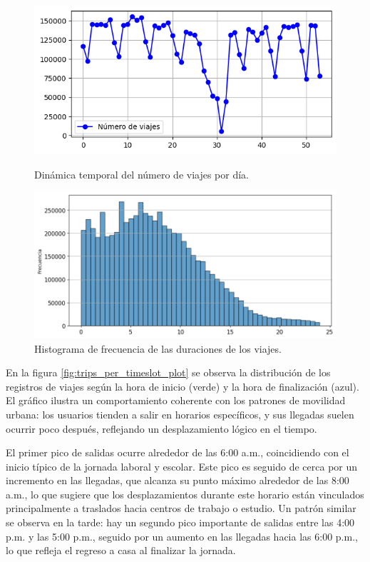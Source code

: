 \begin{figure}[!htb]
\centering
\begin{minipage}{0.45\textwidth}
    \centering
    \includegraphics[width=\textwidth]{Graphics/trips_per_day.png}
    \caption{Dinámica temporal del número de viajes por día.}
    \label{fig:trips_per_day}
\end{minipage}%
\hfill
\begin{minipage}{0.45\textwidth}
    \centering
    \includegraphics[width=\textwidth]{Graphics/trip_duration_histogram.png}
    \caption{Histograma de frecuencia de las duraciones de los viajes.}
    \label{fig:trip_duration_histogram}
\end{minipage}%
\end{figure}

En la figura \ref{fig:trips_per_timeslot_plot} se observa la distribución de los registros de viajes según la hora de inicio (verde) y la hora de finalización (azul). El gráfico ilustra un comportamiento coherente con los patrones de movilidad urbana: los usuarios tienden a salir en horarios específicos, y sus llegadas suelen ocurrir poco después, reflejando un desplazamiento lógico en el tiempo.

El primer pico de salidas ocurre alrededor de las 6:00 a.m., coincidiendo con el inicio típico de la jornada laboral y escolar. Este pico es seguido de cerca por un incremento en las llegadas, que alcanza su punto máximo alrededor de las 8:00 a.m., lo que sugiere que los desplazamientos durante este horario están vinculados principalmente a traslados hacia centros de trabajo o estudio. Un patrón similar se observa en la tarde: hay un segundo pico importante de salidas entre las 4:00 p.m. y las 5:00 p.m., seguido por un aumento en las llegadas hacia las 6:00 p.m., lo que refleja el regreso a casa al finalizar la jornada.

